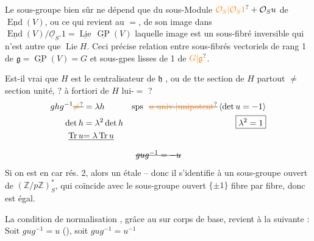 Le sous-groupe  bien sûr ne dépend que du sous-Module $\unsure{\mathcal O_S|\mathcal O_S1}+\mathcal O_Su$ de $\underline{\operatorname{End}}(V)$, ou ce qui revient au $=$, de son image dans $\underline{\operatorname{End}}(V)/\underline{\mathcal O}_S.1=\underline{\operatorname{Lie}}\,\underline{\operatorname{GP}}(V)$ laquelle image est un sous-fibré inversible qui n'est autre que $\operatorname{Lie}H$. Ceci précise relation entre sous-fibrés vectoriels  de rang 1 de $\mathfrak g=\underline{\operatorname{GP}}(V)=G$ et sous-gpes lisses  de   1 de $\unsure{G|\mathfrak g}$.

Est-il vrai que $H$ est le centralisateur de $\mathfrak h$ , ou de tte section de $H$ partout $\ne$ section unité, ? à fortiori de $H$ lui-$=$ ?
\[
\begin{aligned}
ghg^{-1}\deleted{\unsure{\ne}}&=\lambda h
& \text{sps }\ \deleted{\unsure{u\ \mathrm{univ.}|\mathrm{unipotent}}}\,\inserted{\det u=-1}\\
\det h&=\lambda^2\det h & \boxed{\lambda^2=1}\\
\deleted{\operatorname{Tr}u}&\deleted{=\lambda\operatorname{Tr}u}
\end{aligned}
\]
\[
 \deleted{gug^{-1}=-u}
\]
 Si on est en car rés. 2,
 alors un  étale  -- donc il s'identifie à un sous-groupe ouvert  de $(\mathbb Z/p\mathbb Z)^*_S$, qui coïncide avec le sous-groupe ouvert $\{\pm1\}$ fibre par fibre, donc  est égal.

La condition de normalisation , grâce au  sur corps de base, revient à la suivante : Soit $gug^{-1}=u$ (), soit $gug^{-1}=u^{-1}$

